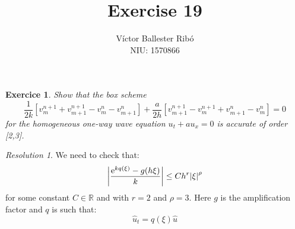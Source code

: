 \documentclass[10pt,a4paper]{article}
\title{\bfseries\Large Exercise 19}
\author{Víctor Ballester Ribó\\NIU: 1570866}
\date{\parbox{\linewidth}{\centering
  Integració numèrica d'equacions en derivades parcials\endgraf
  Grau en Matemàtiques\endgraf
  Universitat Autònoma de Barcelona\endgraf
  Maig de 2023}}
\newcommand{\RR}{\ensuremath{\mathbb{R}}} %
\newtheorem{exercici}{Exercice}
\theoremstyle{definition}
\theoremstyle{remark}
\newtheorem*{res}{Resolution}
\renewcommand{\exp}[1]{\mathrm{e}^{#1}} %
\begin{document}
\maketitle
\begin{exercici}
  Show that the box scheme
  \begin{equation}\label{eq:scheme}
    \frac{1}{2k}\left[v_m^{n+1}+v_{m+1}^{n+1}-v_m^n-v_{m+1}^n\right] +\frac{a}{2h}\left[v_{m+1}^{n+1}-v_m^{n+1}+v_{m+1}^n-v_m^n\right]=0
  \end{equation}
  for the homogeneous one-way wave equation $u_t+au_x=0$ is accurate of order [2,3].
\end{exercici}
\begin{res}
  We need to check that:
  \begin{equation}
    \abs{\frac{\exp{kq(\xi)}-g(h\xi)}{k}}\leq C h^r\abs{\xi}^\rho
  \end{equation}
  for some constant $C\in\RR$ and with $r=2$ and $\rho=3$. Here $g$ is the amplification factor and $q$ is such that:
  $$
    \widehat{u}_t=q(\xi)\widehat{u}
  $$


\end{res}
\end{document}
